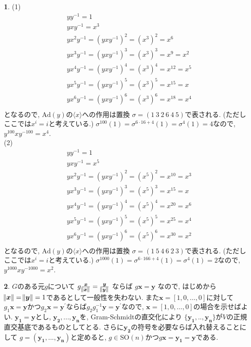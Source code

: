 \documentclass{amsart}
\theoremstyle{definition}
\newtheorem{ans}{}
\numberwithin{ans}{subsection}
\newcommand{\SO}[1]{\mathrm{SO}(#1)}
\newcommand{\Ad}[1]{\mathrm{Ad}(#1)}
\begin{document}
\begin{ans}
  (1)
  \begin{align*}
    &yy^{-1} = 1\\
    &yxy^{-1} = x^3\\
    &yx^2y^{-1} = (yxy^{-1})^2 = (x^3)^2 = x^6\\
    &yx^3y^{-1} = (yxy^{-1})^3 = (x^3)^3 = x^9 = x^2\\
    &yx^4y^{-1} = (yxy^{-1})^4 = (x^3)^4 = x^{12} = x^5\\
    &yx^5y^{-1} = (yxy^{-1})^5 = (x^3)^5 = x^{15} = x\\
    &yx^6y^{-1} = (yxy^{-1})^6 = (x^3)^6 = x^{18} = x^4\\
  \end{align*}
  となるので, $\Ad{y}$の$\langle x \rangle$への作用は置換
  $\sigma = (1\ 3\ 2\ 6\ 4\ 5)$で表される. (ただしここでは$x^i = i$と考えている.)
  $\sigma^{100}(1) = \sigma^{6 \cdot 16 + 4}(1) = \sigma^{4}(1) = 4$なので, $y^{100}xy^{-100} = x^4$.\\
  (2)
  \begin{align*}
    &yy^{-1} = 1\\
    &yxy^{-1} = x^5\\
    &yx^2y^{-1} = (yxy^{-1})^2 = (x^5)^2 = x^{10} = x^3\\
    &yx^3y^{-1} = (yxy^{-1})^3 = (x^5)^3 = x^{15} = x\\
    &yx^4y^{-1} = (yxy^{-1})^4 = (x^5)^4 = x^{20} = x^6\\
    &yx^5y^{-1} = (yxy^{-1})^5 = (x^5)^5 = x^{25} = x^4\\
    &yx^6y^{-1} = (yxy^{-1})^6 = (x^5)^6 = x^{30} = x^2\\
  \end{align*}
  となるので, $\Ad{y}$の$\langle x \rangle$への作用は置換
  $\sigma = (1\ 5\ 4\ 6\ 2\ 3)$で表される. (ただしここでは$x^i = i$と考えている.)
  $\sigma^{1000}(1) = \sigma^{6 \cdot 166 + 4}(1) = \sigma^{4}(1) = 2$なので, $y^{1000}xy^{-1000} = x^2$.\\
\end{ans}

\begin{ans}
  $G$のある元$g$について
  $g\frac{\bm{x}}{\norm{\bm{x}}} = \frac{\bm{y}}{\norm{\bm{y}}}$
  ならば
  $g\bm{x} = \bm{y}$
  なので, はじめから$\norm{\bm{x}} = \norm{\bm{y}} = 1$であるとして一般性を失わない.
  また$\bm{x} = [1, 0,..., 0]$に対して$g_1\bm{x} = \bm{y}$かつ$g_2\bm{x} = \bm{y}^\prime$ならば$g_2g_1^{-1}\bm{y} = \bm{y}^\prime$なので,
  $\bm{x} = [1, 0,..., 0]$の場合を示せばよい.
  $\bm{y_1} = \bm{y}$とし, $\bm{y_2},..., \bm{y_n}$を, Gram-Schmidtの直交化により
  $\{\bm{y_1},.., \bm{y_n}\}$が$V$の正規直交基底であるものとしてとる.
  さらに$\bm{y_2}$の符号を必要ならば入れ替えることにして
  $g = (\bm{y_1},..., \bm{y_n})$と定めると, $g \in \SO{n}$かつ$g\bm{x} = \bm{y_1} = \bm{y}$である.
\end{ans}
\end{document}
